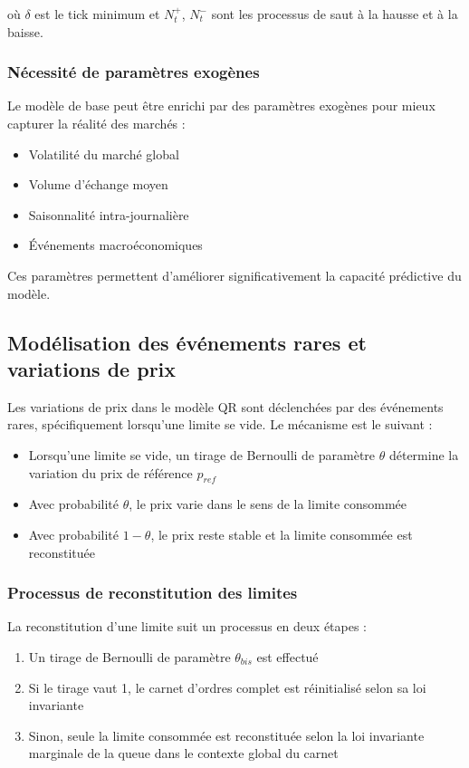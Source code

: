 \documentclass[12pt,a4paper]{article}
\theoremstyle{definition}
\theoremstyle{remark}
\begin{document}
où $\delta$ est le tick minimum et $N_t^+$, $N_t^-$ sont les processus de saut à la hausse et à la baisse.

\subsubsection{Nécessité de paramètres exogènes}

Le modèle de base peut être enrichi par des paramètres exogènes pour mieux capturer la réalité des marchés :

\begin{itemize}
    \item Volatilité du marché global
    \item Volume d'échange moyen
    \item Saisonnalité intra-journalière
    \item Événements macroéconomiques
\end{itemize}

Ces paramètres permettent d'améliorer significativement la capacité prédictive du modèle.


\subsection{Modélisation des événements rares et variations de prix}

Les variations de prix dans le modèle QR sont déclenchées par des événements rares, spécifiquement lorsqu'une limite se vide. Le mécanisme est le suivant :

\begin{itemize}
    \item Lorsqu'une limite se vide, un tirage de Bernoulli de paramètre $\theta$ détermine la variation du prix de référence $p_{ref}$
    \item Avec probabilité $\theta$, le prix varie dans le sens de la limite consommée
    \item Avec probabilité $1-\theta$, le prix reste stable et la limite consommée est reconstituée
\end{itemize}

\subsubsection{Processus de reconstitution des limites}

La reconstitution d'une limite suit un processus en deux étapes :

\begin{enumerate}
    \item Un tirage de Bernoulli de paramètre $\theta_{bis}$ est effectué
    \item Si le tirage vaut 1, le carnet d'ordres complet est réinitialisé selon sa loi invariante
    \item Sinon, seule la limite consommée est reconstituée selon la loi invariante marginale de la queue dans le contexte global du carnet
\end{enumerate}
\end{document}
